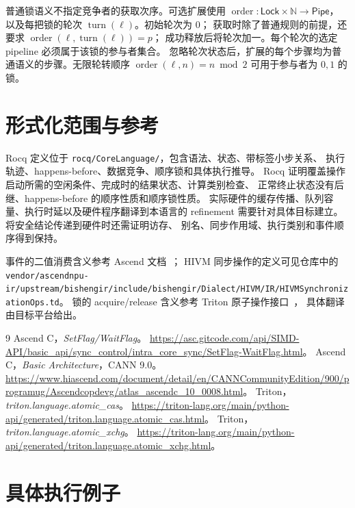 \documentclass[UTF8,a4paper,11pt,fontset=fandol]{ctexart}
\newcommand{\code}{\nolinkurl}
\begin{document}
普通锁语义不指定竞争者的获取次序。可选扩展使用
$\operatorname{order}:\mathsf{Lock}\times\mathbb N\to\mathsf{Pipe}$，
以及每把锁的轮次 $\operatorname{turn}(\ell)$。初始轮次为 $0$；
获取时除了普通规则的前提，还要求
$\operatorname{order}(\ell,\operatorname{turn}(\ell))=p$；
成功释放后将轮次加一。每个轮次的选定 pipeline 必须属于该锁的参与者集合。
忽略轮次状态后，扩展的每个步骤均为普通语义的步骤。无限轮转顺序
$\operatorname{order}(\ell,n)=n\bmod 2$ 可用于参与者为 $0,1$ 的锁。

\section{形式化范围与参考}

Rocq 定义位于 \code{rocq/CoreLanguage/}，包含语法、状态、带标签小步关系、
执行轨迹、happens-before、数据竞争、顺序锁和具体执行推导。
Rocq 证明覆盖操作启动所需的空闲条件、完成时的结果状态、计算类别检查、
正常终止状态没有后继、happens-before 的顺序性质和顺序锁性质。
实际硬件的缓存传播、队列容量、执行时延以及硬件程序翻译到本语言的
refinement 需要针对具体目标建立。将安全结论传递到硬件时还需证明访存、
别名、同步作用域、执行类别和事件顺序得到保持。

事件的二值消费含义参考 Ascend 文档~\cite{ascend-flag,ascend-architecture}；
HIVM 同步操作的定义可见仓库中的
\code{vendor/ascendnpu-ir/upstream/bishengir/include/bishengir/Dialect/HIVM/IR/HIVMSynchronizationOps.td}。
锁的 acquire/release 含义参考 Triton 原子操作接口~\cite{triton-cas,triton-xchg}，
具体翻译由目标平台给出。

\begin{thebibliography}{9}
 Ascend C，\emph{SetFlag/WaitFlag}。
\url{https://asc.gitcode.com/api/SIMD-API/basic_api/sync_control/intra_core_sync/SetFlag-WaitFlag.html}。
 Ascend C，\emph{Basic Architecture}，CANN 9.0。
\url{https://www.hiascend.com/document/detail/en/CANNCommunityEdition/900/programug/Ascendcopdevg/atlas_ascendc_10_0008.html}。
 Triton，\emph{triton.language.atomic\_cas}。
\url{https://triton-lang.org/main/python-api/generated/triton.language.atomic_cas.html}。
 Triton，\emph{triton.language.atomic\_xchg}。
\url{https://triton-lang.org/main/python-api/generated/triton.language.atomic_xchg.html}。
\end{thebibliography}

\clearpage
\section{具体执行例子}
\end{document}
